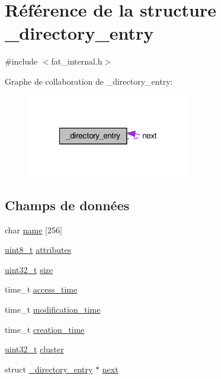 \hypertarget{struct__directory__entry}{\section{Référence de la structure \-\_\-directory\-\_\-entry}
\label{struct__directory__entry}
}


{\ttfamily \#include $<$fat\-\_\-internal.\-h$>$}



Graphe de collaboration de \-\_\-directory\-\_\-entry\-:\nopagebreak
\begin{figure}[H]
\begin{center}
\leavevmode
\includegraphics[width=203pt]{struct__directory__entry__coll__graph}
\end{center}
\end{figure}
\subsection*{Champs de données}
\begin{DoxyCompactItemize}
\item 
char \hyperlink{struct__directory__entry_ac9142fdeb8e265f045fee1edf9608c78}{name} \mbox{[}256\mbox{]}
\item 
\hyperlink{types_8h_aba7bc1797add20fe3efdf37ced1182c5}{uint8\-\_\-t} \hyperlink{struct__directory__entry_a63da8f87e73a3eb30e55b2d405fa35d7}{attributes}
\item 
\hyperlink{types_8h_a33594304e786b158f3fb30289278f5af}{uint32\-\_\-t} \hyperlink{struct__directory__entry_a5d6f559c1b7ab2b5a64643073172cc25}{size}
\item 
time\-\_\-t \hyperlink{struct__directory__entry_a27e1020c5262094ab3b58759da9660ae}{access\-\_\-time}
\item 
time\-\_\-t \hyperlink{struct__directory__entry_a120c3a3857bd7892a0fc2e6644e6f188}{modification\-\_\-time}
\item 
time\-\_\-t \hyperlink{struct__directory__entry_a95f0f5ef18bf17f332bd0dc352d62ac4}{creation\-\_\-time}
\item 
\hyperlink{types_8h_a33594304e786b158f3fb30289278f5af}{uint32\-\_\-t} \hyperlink{struct__directory__entry_a8c70d9d0c2b2557cba83fb827d5c6e90}{cluster}
\item 
struct \hyperlink{struct__directory__entry}{\-\_\-directory\-\_\-entry} $\ast$ \hyperlink{struct__directory__entry_a75001bda0d1d80e4ff5350ad69f83030}{next}
\end{DoxyCompactItemize}


